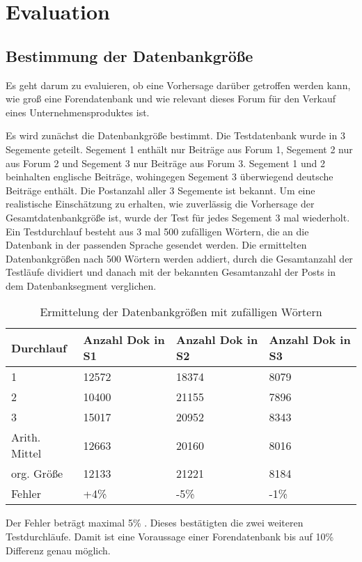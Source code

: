 \section{Evaluation}
\subsection{Bestimmung der Datenbankgröße}

Es geht darum zu evaluieren, ob eine Vorhersage darüber getroffen werden kann, wie groß eine Forendatenbank und wie relevant dieses Forum für den Verkauf eines Unternehmensproduktes ist.

Es wird zunächst die Datenbankgröße bestimmt. Die Testdatenbank wurde in 3 Segemente geteilt. Segement 1 enthält nur Beiträge aus Forum 1, Segement 2 nur aus Forum 2 und Segement 3 nur Beiträge aus Forum 3. 
Segement 1 und 2 beinhalten englische Beiträge, wohingegen Segement 3 überwiegend deutsche Beiträge enthält. Die Postanzahl aller 3 Segemente ist bekannt. Um eine realistische Einschätzung zu erhalten, wie zuverlässig die Vorhersage der Gesamtdatenbankgröße ist, wurde der Test für jedes Segement 3 mal wiederholt. Ein Testdurchlauf besteht aus 3 mal 500 zufälligen Wörtern, die an die Datenbank in der passenden Sprache gesendet werden. Die ermittelten Datenbankgrößen nach 500 Wörtern werden addiert, durch die Gesamtanzahl der Testläufe dividiert und danach mit der bekannten Gesamtanzahl der Posts in dem Datenbanksegment verglichen.

\begin{table}[h!]
\begin{tabular}{ | p{3cm} | p{3cm} | p{3cm}| p{3cm} |} \hline
Durchlauf & Anzahl Dok in S1 & Anzahl Dok in S2 & Anzahl Dok in S3 \\ \hline
1 & 12572 & 18374 & 8079 \\ \hline
2 & 10400 & 21155 & 7896 \\ \hline
3 & 15017 & 20952 & 8343 \\ \hline
Arith. Mittel & 12663 & 20160 & 8016 \\ \hline
org. Größe & 12133 & 21221 & 8184 \\ \hline
Fehler & +4\% & -5\% & -1\% \\ \hline
\end{tabular}
\caption{Ermittelung der Datenbankgrößen mit zufälligen Wörtern}
\end{table}

Der Fehler beträgt maximal 5\% . Dieses bestätigten die zwei weiteren Testdurchläufe. Damit ist eine Voraussage einer Forendatenbank bis auf 10\% Differenz genau möglich.
